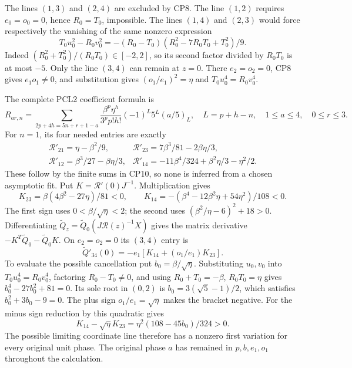 \documentclass[11pt]{article}
\begin{document}
The lines $(1,3)$ and $(2,4)$ are excluded by CP8. The line
$(1,2)$ requires $e_0=o_0=0$, hence $R_0=T_0$, impossible.
The lines $(1,4)$ and $(2,3)$ would force respectively the vanishing
of the same nonzero expression
\[
 T_0u_0^2-R_0v_0^2
 =-(R_0-T_0)(R_0^2-7R_0T_0+T_0^2)/9.                             \tag{CP9}
\]
Indeed $(R_0^2+T_0^2)/(R_0T_0)\in[-2,2]$, so its second factor
divided by $R_0T_0$ is at most $-5$. Only the line $(3,4)$
can remain at $z=0$. There $e_2=o_2=0$, CP8 gives $e_1o_1\ne0$,
and substitution gives $(o_1/e_1)^2=\eta$ and
$T_0u_0^4=R_0v_0^4$.

The complete PCL2 coefficient formula is
\[
 R_{ar,n}=\sum_{2p+4h=5n+r+1-a}
 \frac{\beta^p\eta^h}{3^pp!h!}(-1)^L5^L(a/5)_L,
 \quad L=p+h-n,\quad1\le a\le4,\quad0\le r\le3.                  \tag{CP10}
\]
For $n=1$, its four needed entries are exactly
\[
 \begin{array}{ll}
 \mathcal R'_{21}=\eta-\beta^2/9,
 &\mathcal R'_{23}=7\beta^3/81-2\beta\eta/3,\\
 \mathcal R'_{12}=\beta^3/27-\beta\eta/3,
 &\mathcal R'_{14}=-11\beta^4/324+\beta^2\eta/3-\eta^2/2.
 \end{array}                                                       \tag{CP11}
\]
These follow by the finite sums in CP10, so none is inferred from
a chosen asymptotic fit. Put $K=\mathcal R'(0)J^{-1}$. Multiplication
gives
\[
 K_{23}=\beta(4\beta^2-27\eta)/81<0,\qquad
 K_{14}=-(\beta^4-12\beta^2\eta+54\eta^2)/108<0.                   \tag{CP12}
\]
The first sign uses $0<\beta/\sqrt\eta<2$; the second uses
$(\beta^2/\eta-6)^2+18>0$. Differentiating
$\widetilde Q_z=\widetilde Q_0(J\mathcal R(z)^{-1}X)$ gives the
matrix derivative $-K^T\widetilde Q_0-\widetilde Q_0K$.
On $e_2=o_2=0$ its $(3,4)$ entry is
\[
 \widetilde Q'_{34}(0)=-e_1[K_{14}+(o_1/e_1)K_{23}].                \tag{CP13}
\]
To evaluate the possible cancellation put $b_0=\beta/\sqrt\eta$.
Substituting $u_0,v_0$ into $T_0u_0^4=R_0v_0^4$, factoring
$R_0-T_0\ne0$, and using $R_0+T_0=-\beta$, $R_0T_0=\eta$
gives $b_0^4-27b_0^2+81=0$. Its sole root in $(0,2)$ is
$b_0=3(\sqrt5-1)/2$, which satisfies $b_0^2+3b_0-9=0$.
The plus sign $o_1/e_1=\sqrt\eta$ makes the bracket negative.
For the minus sign reduction by this quadratic gives
\[
 K_{14}-\sqrt\eta K_{23}=\eta^2(108-45b_0)/324>0.                 \tag{CP14}
\]
The possible limiting coordinate line therefore has a nonzero first
variation for every original unit phase. The original phase $a$
has remained in $p,b,e_1,o_1$ throughout the calculation.
\end{document}
